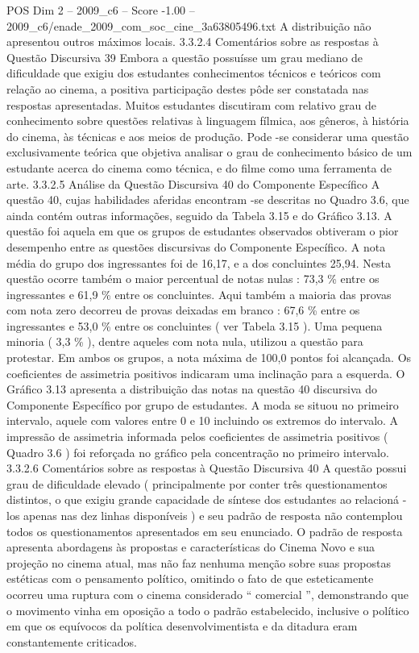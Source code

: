 \begin{textsample}{POS Dim 2 – 2009\_c6 – Score -1.00 – 2009\_c6/enade\_2009\_com\_soc\_cine\_3a63805496.txt}
A distribuição não apresentou outros máximos locais. 3.3.2.4 Comentários sobre as respostas à Questão Discursiva 39 Embora a questão possuísse um grau mediano de dificuldade que exigiu dos estudantes conhecimentos técnicos e teóricos com relação ao cinema, a positiva participação destes pôde ser constatada nas respostas apresentadas.
Muitos estudantes discutiram com relativo grau de conhecimento sobre questões relativas à linguagem fílmica, aos gêneros, à história do cinema, às técnicas e aos meios de produção.
Pode -se considerar uma questão exclusivamente teórica que objetiva analisar o grau de conhecimento básico de um estudante acerca do cinema como técnica, e do filme como uma ferramenta de arte. 3.3.2.5 Análise da Questão Discursiva 40 do Componente Específico A questão 40, cujas habilidades aferidas encontram -se descritas no Quadro 3.6, que ainda contém outras informações, seguido da Tabela 3.15 e do Gráfico 3.13.
A questão foi aquela em que os grupos de estudantes observados obtiveram o pior desempenho entre as questões discursivas do Componente Específico.
A nota média do grupo dos ingressantes foi de 16,17, e a dos concluintes 25,94.
Nesta questão ocorre também o maior percentual de notas nulas : 73,3 \% entre os ingressantes e 61,9 \% entre os concluintes.
Aqui também a maioria das provas com nota zero decorreu de provas deixadas em branco : 67,6 \% entre os ingressantes e 53,0 \% entre os concluintes ( ver Tabela 3.15 ).
Uma pequena minoria ( 3,3 \% ), dentre aqueles com nota nula, utilizou a questão para protestar.
Em ambos os grupos, a nota máxima de 100,0 pontos foi alcançada.
Os coeficientes de assimetria positivos indicaram uma inclinação para a esquerda.
O Gráfico 3.13 apresenta a distribuição das notas na questão 40 discursiva do Componente Específico por grupo de estudantes.
A moda se situou no primeiro intervalo, aquele com valores entre 0 e 10 incluindo os extremos do intervalo.
A impressão de assimetria informada pelos coeficientes de assimetria positivos ( Quadro 3.6 ) foi reforçada no gráfico pela concentração no primeiro intervalo. 3.3.2.6 Comentários sobre as respostas à Questão Discursiva 40 A questão possui grau de dificuldade elevado ( principalmente por conter três questionamentos distintos, o que exigiu grande capacidade de síntese dos estudantes ao relacioná -los apenas nas dez linhas disponíveis ) e seu padrão de resposta não contemplou todos os questionamentos apresentados em seu enunciado.
O padrão de resposta apresenta abordagens às propostas e características do Cinema Novo e sua projeção no cinema atual, mas não faz nenhuma menção sobre suas propostas estéticas com o pensamento político, omitindo o fato de que esteticamente ocorreu uma ruptura com o cinema considerado “ comercial ”, demonstrando que o movimento vinha em oposição a todo o padrão estabelecido, inclusive o político em que os equívocos da política desenvolvimentista e da ditadura eram constantemente criticados.

\end{textsample}

